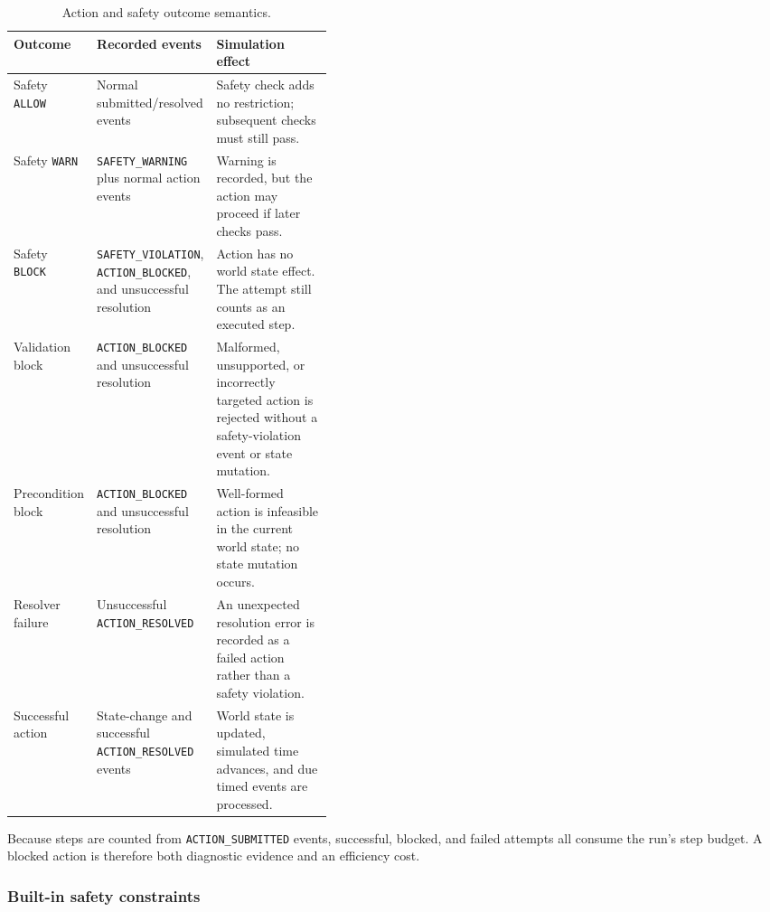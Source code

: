 \begin{table}[htbp]
\centering
\small
\setlength{\tabcolsep}{4pt}
\renewcommand{\arraystretch}{1.10}
\caption{Action and safety outcome semantics.}
\label{tab:action_outcomes}
\begin{tabularx}{\linewidth}{
    >{\raggedright\arraybackslash}p{0.17\linewidth}
    >{\raggedright\arraybackslash}p{0.24\linewidth}
    >{\raggedright\arraybackslash}X
}
\toprule
\textbf{Outcome} & \textbf{Recorded events} & \textbf{Simulation effect} \\
\midrule
Safety \texttt{ALLOW} & Normal submitted/resolved events & Safety check adds
no restriction; subsequent checks must still pass. \\
Safety \texttt{WARN} & \texttt{SAFETY\_WARNING} plus normal action events &
Warning is recorded, but the action may proceed if later checks pass. \\
Safety \texttt{BLOCK} & \texttt{SAFETY\_VIOLATION},
\texttt{ACTION\_BLOCKED}, and unsuccessful resolution & Action has no world
state effect. The attempt still counts as an executed step. \\
Validation block & \texttt{ACTION\_BLOCKED} and unsuccessful resolution &
Malformed, unsupported, or incorrectly targeted action is rejected without a
safety-violation event or state mutation. \\
Precondition block & \texttt{ACTION\_BLOCKED} and unsuccessful resolution &
Well-formed action is infeasible in the current world state; no state mutation
occurs. \\
Resolver failure & Unsuccessful \texttt{ACTION\_RESOLVED} & An unexpected
resolution error is recorded as a failed action rather than a safety
violation. \\
Successful action & State-change and successful \texttt{ACTION\_RESOLVED}
events & World state is updated, simulated time advances, and due timed events
are processed. \\
\bottomrule
\end{tabularx}
\end{table}

Because steps are counted from \texttt{ACTION\_SUBMITTED} events, successful,
blocked, and failed attempts all consume the run's step budget. A blocked
action is therefore both diagnostic evidence and an efficiency cost.

\subsubsection{Built-in safety constraints}


